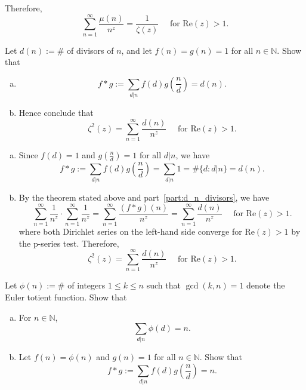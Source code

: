 \documentclass{elegantbook}
\begin{document}
\begin{problemset}[Exercises]
\begin{solution}
\begin{enumerate}[(a)]
      Therefore,
      \[
        \sum_{n=1}^{\infty} \frac{\mu(n)}{n^z} = \frac{1}{\zeta(z)} \quad \text{ for } \mathrm{Re}(z)>1.
      \]
    \end{enumerate}
  \end{solution}
  \item \label{ex:d_n_divisors} Let $d(n) := \#$ of divisors of $n$, and let $f(n)=g(n)=1$ for all $n \in \mathbb{N}$. Show that
  \begin{enumerate}[(a)]
    \item \label{part:d_n_divisors} \[
            f * g := \sum_{d|n} f(d) g\left(\frac{n}{d}\right) = d(n).
          \]
    \item Hence conclude that
    \[
      \zeta^2(z) = \sum_{n=1}^{\infty} \frac{d(n)}{n^z} \quad \text{ for } \mathrm{Re}(z)>1.
    \]
  \end{enumerate}
  \begin{solution}
    \begin{enumerate}[(a)]
      \item Since $f(d) = 1$ and $g\left(\frac{n}{d}\right) = 1$ for all $d|n$, we have
      \[
        f * g := \sum_{d|n} f(d) g\left(\frac{n}{d}\right) = \sum_{d|n} 1 = \#\{ d : d|n \} = d(n).
      \]
      \item By the theorem stated above and part~\ref{part:d_n_divisors}, we have
      \[
        \sum_{n=1}^{\infty} \frac{1}{n^z} \cdot \sum_{n=1}^{\infty} \frac{1}{n^z} = \sum_{n=1}^{\infty} \frac{(f * g)(n)}{n^z} = \sum_{n=1}^{\infty} \frac{d(n)}{n^z} \quad \text{ for } \mathrm{Re}(z)>1.
      \]
      where both Dirichlet series on the left-hand side converge for $\mathrm{Re}(z)>1$ by the p-series test.
      Therefore,
      \[
        \zeta^2(z) = \sum_{n=1}^{\infty} \frac{d(n)}{n^z} \quad \text{ for } \mathrm{Re}(z)>1.
      \]
    \end{enumerate}
  \end{solution}
  \item \label{ex:euler_totient} Let $\phi(n) := \#$ of integers $1 \leq k \leq n$ such that $\gcd(k,n)=1$ denote the Euler totient function. Show that
  \begin{enumerate}[(a)]
    \item \label{part:euler_totient_sum} For $n \in \mathbb{N}$,
            \[
              \sum_{d|n} \phi(d) = n.
            \]
    \item \label{part:euler_totient_dirichlet} Let $f(n) = \phi(n)$ and $g(n) = 1$ for all $n \in \mathbb{N}$. Show that
            \[
              f * g := \sum_{d|n} f(d) g\left(\frac{n}{d}\right) = n.
\]
\end{enumerate}
\end{problemset}
\end{document}
